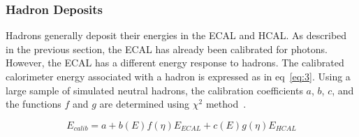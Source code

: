 


\subsubsection{Hadron Deposits}

Hadrons generally deposit their energies in the ECAL and HCAL.
As described in the previous section, the ECAL has already been calibrated for photons.
However, the ECAL has a different energy response to hadrons.
The calibrated calorimeter energy associated with a hadron is expressed as in eq~\ref{eq:3}.
Using a large sample of simulated neutral hadrons, the calibration coefficients $a$, $b$, $c$, and the functions $f$ and $g$ are determined using $\chi^{2}$ method~\cite{PF}. 

\begin{equation}
E_{calib} = a + b(E)f(\eta)E_{ECAL} + c(E)g(\eta)E_{HCAL}
\label{eq:3}
\end{equation}
